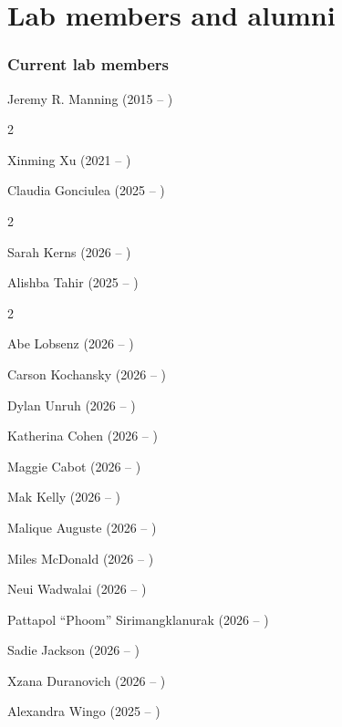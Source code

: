 \documentclass{tufte-book} %
\begin{document}
\chapter{Lab members and alumni}\label{ch:members}
\begin{fullwidth}
\subsection{Current lab members}\label{sec:curr_members}
\bigskip

\enskip Jeremy R. Manning (2015 -- )

\begin{multicols}{2}\raggedcolumns
\begin{list}{\quad}{}
\item Xinming Xu (2021 -- )
\item Claudia Gonciulea (2025 -- )
\end{list}
\end{multicols}



\begin{multicols}{2}\raggedcolumns
\begin{list}{\quad}{}
\item Sarah Kerns (2026 -- )
\item Alishba Tahir (2025 -- )
\end{list}
\end{multicols}

\begin{multicols}{2}\raggedcolumns
\begin{list}{\quad}{}
\item Abe Lobsenz (2026 -- )
\item Carson Kochansky (2026 -- )
\item Dylan Unruh (2026 -- )
\item Katherina Cohen (2026 -- )
\item Maggie Cabot (2026 -- )
\item Mak Kelly (2026 -- )
\item Malique Auguste (2026 -- )
\item Miles McDonald (2026 -- )
\item Neui Wadwalai (2026 -- )
\item Pattapol ``Phoom'' Sirimangklanurak (2026 -- )
\item Sadie Jackson (2026 -- )
\item Xzana Duranovich (2026 -- )
\item Alexandra Wingo (2025 -- )


\end{list}
\end{multicols}
\end{fullwidth}
\end{document}
